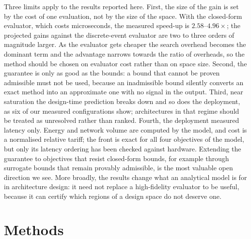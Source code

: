 \documentclass[pdflatex,sn-nature,lineno]{sn-jnl}
\newcommand{\AnalyticalSpeedup}{2.58\text{--}4.96}
\begin{document}
Three limits apply to the results reported here. First, the size of the gain is set by the cost of one evaluation, not by the size of the
space. With the closed-form evaluator, which costs microseconds, the measured speed-up is
$\AnalyticalSpeedup\times$; the projected gains against the discrete-event evaluator are two
to three orders of magnitude larger. As the evaluator gets cheaper the search overhead
becomes the dominant term and the advantage narrows towards the ratio of overheads, so
the method should be chosen on evaluator cost rather than on space size. Second, the
guarantee is only as good as the bounds: a bound that cannot be proven admissible must
not be used, because an inadmissible bound silently converts an exact method into an
approximate one with no signal in the output. Third, near saturation the design-time
prediction breaks down and so does the deployment, as six of our measured configurations
show; architectures in that regime should be treated as unresolved rather than ranked.
Fourth, the deployment measured latency only. Energy and network volume are computed by
the model, and cost is a normalised relative tariff; the front is exact for all four
objectives of the model, but only its latency ordering has been checked against hardware.
Extending the guarantee to objectives that resist closed-form bounds, for example through
surrogate bounds that remain provably admissible, is the most valuable open direction we
see. More broadly, the results change what an analytical model is for in architecture
design: it need not replace a high-fidelity evaluator to be useful, because it can
certify which regions of a design space do not deserve one.
\section{Methods}
\label{sec:sn:methods}
\end{document}
